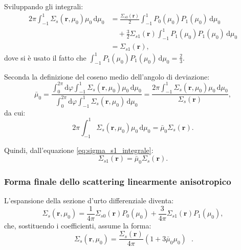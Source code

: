 Sviluppando gli integrali:
\begin{equation}
	\begin{aligned}
		2\pi \int_{-1}^{1} \Sigma_s(\mathbf{r}, \mu_0) \mu_0 \, \mathrm{d}\mu_0 &= \frac{\Sigma_{s0}(\mathbf{r})}{2} \int_{-1}^{1} P_0(\mu_0) P_1(\mu_0) \, \mathrm{d}\mu_0 \\
		&\quad + \frac{3}{2} \Sigma_{s1}(\mathbf{r}) \int_{-1}^{1} P_1(\mu_0) P_1(\mu_0) \, \mathrm{d}\mu_0 \\
		&= \Sigma_{s1}(\mathbf{r}),
	\end{aligned}
\end{equation}
dove si è usato il fatto che $\int_{-1}^{1} P_1(\mu_0) P_1(\mu_0) \, \mathrm{d}\mu_0 = \frac{2}{3}$.

Seconda la definizione del coseno medio dell’angolo di deviazione:
\begin{equation}
	\bar{\mu}_0 = \frac{\int_{0}^{2\pi} \mathrm{d}\varphi \int_{-1}^{1} \Sigma_s(\mathbf{r}, \mu_0) \mu_0 \, \mathrm{d}\mu_0}{\int_{0}^{2\pi} \mathrm{d}\varphi \int_{-1}^{1} \Sigma_s(\mathbf{r}, \mu_0) \, \mathrm{d}\mu_0} = \frac{2\pi \int_{-1}^{1} \Sigma_s(\mathbf{r}, \mu_0) \mu_0 \, \mathrm{d}\mu_0}{\Sigma_s(\mathbf{r})},
\end{equation}
da cui:
\begin{equation}
	2\pi \int_{-1}^{1} \Sigma_s(\mathbf{r}, \mu_0) \mu_0 \, \mathrm{d}\mu_0 = \bar{\mu}_0 \Sigma_s(\mathbf{r}).
\end{equation}

Quindi, dall’equazione \eqref{eq:sigma_s1_integrale}:
\begin{equation}
	\Sigma_{s1}(\mathbf{r}) = \bar{\mu}_0 \Sigma_s(\mathbf{r}).
\end{equation}

\subsubsection{Forma finale dello scattering linearmente anisotropico}
L'espansione della sezione d'urto differenziale diventa:
\begin{equation}
	\Sigma_s (\mathbf{r}, \mu_0) = \frac{1}{4\pi} \Sigma_{s0} (\mathbf{r}) P_0 (\mu_0) + \frac{3}{4\pi} \Sigma_{s1} (\mathbf{r}) P_1 (\mu_0),
\end{equation}
che, sostituendo i coefficienti, assume la forma:
\begin{equation}
	\boxed{\ \Sigma_s (\mathbf{r}, \mu_0) = \frac{\Sigma_s (\mathbf{r})}{4\pi} (1 + 3 \bar{\mu}_0 \mu_0)\ }\ \ .
\end{equation}


